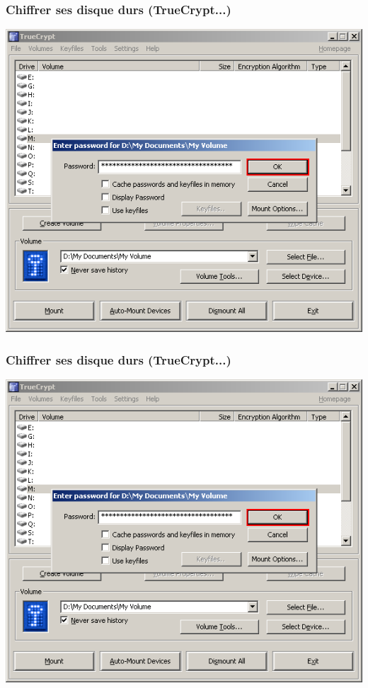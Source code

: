 \documentclass{beamer}
\begin{document}
\begin{frame}
\frametitle{Chiffrer ses disque durs (TrueCrypt...)}
\begin{center}
\includegraphics[scale=0.4] {./images/Truecrypt18.png}
\end{center}
\end{frame}

\begin{frame}
\frametitle{Chiffrer ses disque durs (TrueCrypt...)}
\begin{center}
\includegraphics[scale=0.4] {./images/Truecrypt18.png}
\end{center}
\end{frame}
\end{document}
